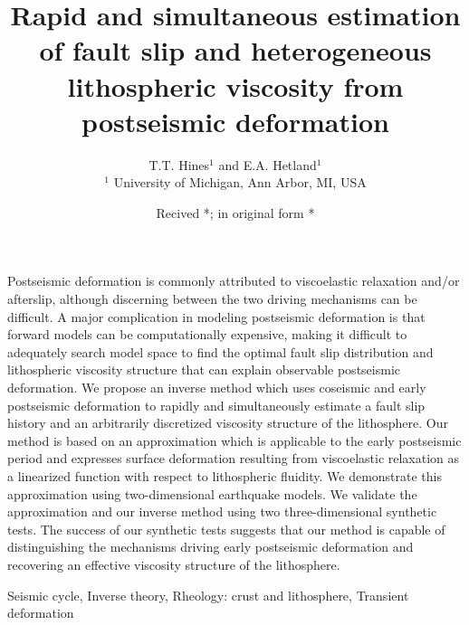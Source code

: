 \documentclass[extra,mreferee]{gji}
\title[Estimation of slip and viscosity from postseismic
  deformation]{Rapid and simultaneous estimation of fault slip and
  heterogeneous lithospheric viscosity from postseismic deformation}
\author[T.T. Hines and E.A Hetland]{T.T. Hines$^1$ and
  E.A. Hetland$^1$\\ $^1$ University of Michigan, Ann Arbor, MI, USA}
\date{Recived *; in original form *}
\begin{document}
\label{firstpage}

\maketitle

\begin{summary}
Postseismic deformation is commonly attributed to viscoelastic
relaxation and/or afterslip, although discerning between the two
driving mechanisms can be difficult.  A major complication in modeling
postseismic deformation is that forward models can be computationally
expensive, making it difficult to adequately search model space to
find the optimal fault slip distribution and lithospheric viscosity
structure that can explain observable postseismic deformation.  We
propose an inverse method which uses coseismic and early postseismic
deformation to rapidly and simultaneously estimate a fault slip
history and an arbitrarily discretized viscosity structure of the
lithosphere. Our method is based on an approximation which is
applicable to the early postseismic period and expresses surface
deformation resulting from viscoelastic relaxation as a linearized
function with respect to lithospheric fluidity.  We demonstrate this
approximation using two-dimensional earthquake models.  We validate
the approximation and our inverse method using two three-dimensional
synthetic tests. The success of our synthetic tests suggests that our
method is capable of distinguishing the mechanisms driving early
postseismic deformation and recovering an effective viscosity
structure of the lithosphere.


\end{summary}

\begin{keywords}
Seismic cycle, Inverse theory, Rheology: crust and lithosphere,
Transient deformation
\end{keywords}
\end{document}

